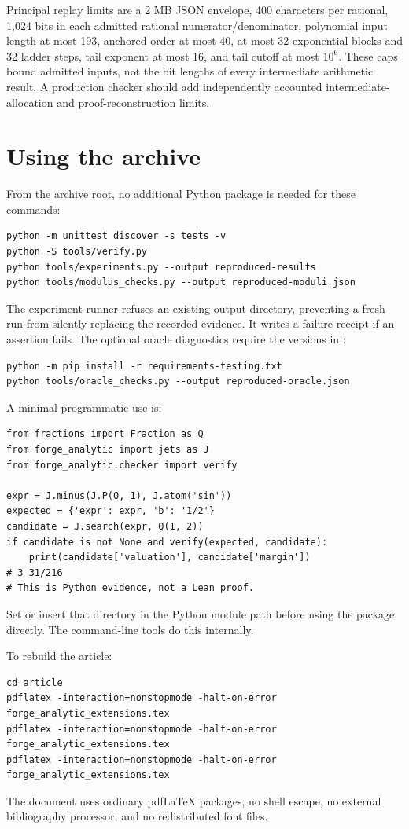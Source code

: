 \documentclass[11pt,a4paper]{article}
\theoremstyle{definition}\newtheorem{definition}[theorem]{Definition}
\newcommand{\code}[1]{\texttt{\detokenize{#1}}}
\begin{document}
Principal replay limits are a 2 MB JSON envelope, 400 characters per rational,
1,024 bits in each admitted rational numerator/denominator, polynomial input
length at most 193, anchored order at most 40, at most 32 exponential blocks and
32 ladder steps, tail exponent at most 16, and tail cutoff at most $10^6$.
These caps bound admitted inputs, not the bit lengths of every intermediate
arithmetic result. A production checker should add independently accounted
intermediate-allocation and proof-reconstruction limits.

\section{Using the archive}
\label{app:use}

From the archive root, no additional Python package is needed for these commands:
\begin{lstlisting}
python -m unittest discover -s tests -v
python -S tools/verify.py
python tools/experiments.py --output reproduced-results
python tools/modulus_checks.py --output reproduced-moduli.json
\end{lstlisting}
The experiment runner refuses an existing output directory, preventing a fresh
run from silently replacing the recorded evidence. It writes a failure receipt
if an assertion fails. The optional oracle diagnostics require the versions in
\code{requirements-testing.txt}:
\begin{lstlisting}
python -m pip install -r requirements-testing.txt
python tools/oracle_checks.py --output reproduced-oracle.json
\end{lstlisting}

A minimal programmatic use is:
\begin{lstlisting}
from fractions import Fraction as Q
from forge_analytic import jets as J
from forge_analytic.checker import verify

expr = J.minus(J.P(0, 1), J.atom('sin'))
expected = {'expr': expr, 'b': '1/2'}
candidate = J.search(expr, Q(1, 2))
if candidate is not None and verify(expected, candidate):
    print(candidate['valuation'], candidate['margin'])
# 3 31/216
# This is Python evidence, not a Lean proof.
\end{lstlisting}
Set \code{PYTHONPATH=prototype} or insert that directory in the Python module
path before using the package directly. The command-line tools do this
internally.

To rebuild the article:
\begin{lstlisting}
cd article
pdflatex -interaction=nonstopmode -halt-on-error forge_analytic_extensions.tex
pdflatex -interaction=nonstopmode -halt-on-error forge_analytic_extensions.tex
pdflatex -interaction=nonstopmode -halt-on-error forge_analytic_extensions.tex
\end{lstlisting}
The document uses ordinary pdf\LaTeX{} packages, no shell escape, no external
bibliography processor, and no redistributed font files.
\end{document}
